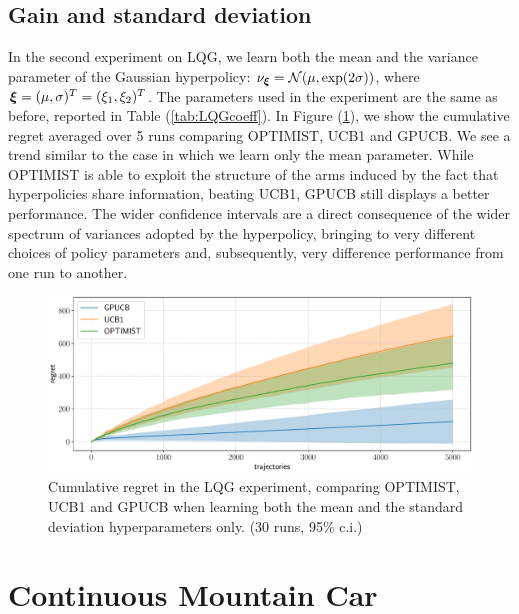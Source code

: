 \subsection{Gain and standard deviation}
In the second experiment on \gls{LQG}, we learn both the mean and the variance parameter of the Gaussian hyperpolicy: $\nu_{\boldsymbol{\xi}} = \mathcal{N}(\mu, \exp(2\sigma))$, where $\boldsymbol{\xi}=(\mu,\sigma)^T=(\xi_1,\xi_2)^T$. The parameters used in the experiment are the same as before, reported in Table (\ref{tab:LQGcoeff}).
In Figure (\ref{fig:LQGcomparisonVar}), we show the cumulative regret averaged over 5 runs comparing \gls{OPTIMIST}, \gls{UCB}1 and \gls{GPUCB}. We see a trend similar to the case in which we learn only the mean parameter. While \gls{OPTIMIST} is able to exploit the structure of the arms induced by the fact that hyperpolicies share information, beating \gls{UCB}1, \gls{GPUCB} still displays a better performance. The wider confidence intervals are a direct consequence of the wider spectrum of variances adopted by the hyperpolicy, bringing to very different choices of policy parameters and, subsequently, very difference performance from one run to another.

\begin{figure}[t!] 
\centering
\includegraphics[width=\textwidth,height=\textheight,keepaspectratio]{Images/LQGcomparisonVar.pdf}
\caption{Cumulative regret in
the \gls{LQG} experiment, comparing
\gls{OPTIMIST}, \gls{UCB}1 and \gls{GPUCB} when learning both the mean and the standard deviation hyperparameters only.
(30 runs, 95\% c.i.)} 
\label{fig:LQGcomparisonVar} 
\end{figure}


\section{Continuous Mountain Car}

